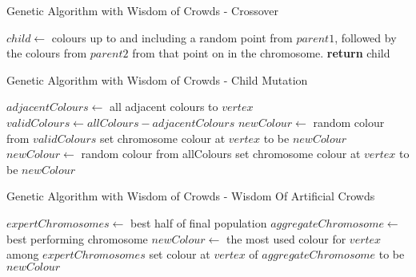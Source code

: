 \begin{algorithm}
\begin{algorithmic}[1]
\caption{Genetic Algorithm with Wisdom of Crowds - Crossover}
		\State $child \gets$ colours up to and including a random point from $parent1$, followed by the colours from $parent2$ from that point on in the chromosome.
		\State \textbf{return} child
	\EndProcedure
\end{algorithmic}
\end{algorithm}

\begin{algorithm}[H]
\begin{algorithmic}[1]
\caption{Genetic Algorithm with Wisdom of Crowds - Child Mutation}
			\State $adjacentColours \gets$ all adjacent colours to $vertex$
			\State $validColours \gets allColours - adjacentColours$
			\State $newColour \gets$ random colour from $validColours$
			\State set chromosome colour at $vertex$ to be $newColour$
			\EndIf
		\EndFor
	\EndProcedure\\
	\setcounter{ALG@line}{0}
				\State $newColour \gets$ random colour from allColours
				\State set chromosome colour at $vertex$ to be $newColour$
			\EndIf
		\EndFor
	\EndProcedure
\end{algorithmic}
\end{algorithm}

\begin{algorithm}[H]
\begin{algorithmic}[1]
\caption{Genetic Algorithm with Wisdom of Crowds - Wisdom Of Artificial Crowds}
		\State $expertChromosomes \gets$ best half of final population
		\State $aggregateChromosome \gets$ best performing chromosome
				\State $newColour \gets$ the most used colour for $vertex$ among $expertChromosomes$
				\State set colour at $vertex$ of $aggregateChromosome$ to be $newColour$
			\EndIf
		\EndFor
	\EndProcedure
\end{algorithmic}
\end{algorithm}

